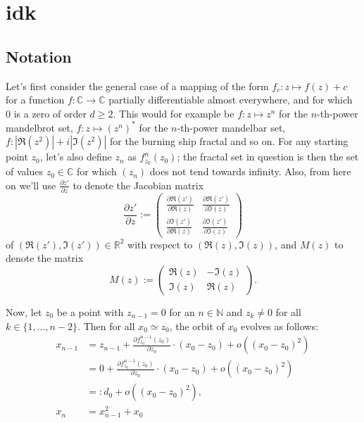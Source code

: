 \documentclass[12pt,a4paper]{article}
\newcommand{\abs}[1]{\left|#1\right|}
\newcommand{\restrict}[1]{\left.#1\right|}
\newcommand{\mat}[1]{\begin{pmatrix}#1\end{pmatrix}}
\newcommand{\setN}{\mathbb N}
\newcommand{\setR}{\mathbb R}
\newcommand{\setC}{\mathbb C}
\begin{document}
	
\section{idk}

\subsection{Notation}


Let's first consider the general case of a mapping of the form $f_c:z\mapsto f(z)+c$ for a function $f:\setC\to\setC$ partially differentiable almost everywhere, and for which $0$ is a zero of order $d\geq 2$. This would for example be $f:z\mapsto z^n$ for the $n$-th-power mandelbrot set, $f:z\mapsto(z^n)^*$ for the $n$-th-power mandelbar set, $f:\abs{\Re(z^2)}+i\abs{\Im(z^2)}$ for the burning ship fractal and so on. For any starting point $z_0$, let's also define $z_n$ as $f_{z_0}^n(z_0)$; the fractal set in question is then the set of values $z_0\in\setC$ for which $(z_n)$ does not tend towards infinity. Also, from here on we'll use $\frac{\partial z'}{\partial z}$ to denote the Jacobian matrix $$\frac{\partial z'}{\partial z}:=\mat{\frac{\partial\Re(z')}{\partial\Re(z)}&\frac{\partial\Re(z')}{\partial\Im(z)}\\\frac{\partial\Im(z')}{\partial\Re(z)}&\frac{\partial\Im(z')}{\partial\Im(z)}}$$ of $(\Re(z'),\Im(z'))\in\setR^2$ with respect to $(\Re(z),\Im(z))$, and $M(z)$ to denote the matrix $$M(z):=\mat{\Re(z)&-\Im(z)\\\Im(z)&\Re(z)}.$$

Now, let $z_0$ be a point with $z_{n-1}=0$ for an $n\in\setN$ and $z_k\neq 0$ for all $k\in\{1,...,n-2\}$. Then for all $x_0\simeq z_0$, the orbit of $x_0$ evolves as follows:
\begin{align*}
	x_{n-1}&=z_{n-1}+\frac{\partial f_{z_0}^{n-1}(z_0)}{\partial z_0}\cdot(x_0-z_0)+o((x_0-z_0)^2)\\
	&=0+\frac{\partial f_{z_0}^{n-1}(z_0)}{\partial z_0}\cdot(x_0-z_0)+o((x_0-z_0)^2)\\
	&=:d_0+o((x_0-z_0)^2),\\
	x_n&=x_{n-1}^2+x_0
\end{align*}
\end{document}
